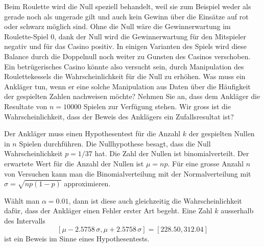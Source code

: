Beim Roulette wird die Null speziell behandelt, weil sie zum Beispiel
weder als gerade noch als ungerade gilt und auch kein Gewinn über
die Einsätze auf rot oder schwarz möglich sind.
Ohne die Null wäre die Gewinnerwartung im Roulette-Spiel 0,
dank der Null wird die Gewinnerwartung für den Mitspieler negativ
und für das Casino positiv. 
In einigen Varianten des Spiels wird diese Balance durch die Doppelnull
noch weiter zu Gunsten des Casinos verschoben.
Ein betrügerisches Casino könnte also versucht sein, durch Manipulation
des Roulettekessels die Wahrscheinlichkeit für die Null zu erhöhen.
Was muss ein Ankläger tun, wenn er eine solche Manipulation
aus Daten über die Häufigkeit der gespielten Zahlen nachweisen möchte?
Nehmen Sie an, dass dem Ankläger die Resultate von $n=10000$ Spielen
zur Verfügung stehen.
Wir gross ist die Wahrscheinlichkeit, dass der Beweis des Anklägers
ein Zufallsresultat ist?

\begin{loesung}
Der Ankläger muss einen Hypothesentest für die Anzahl $k$ der gespielten
Nullen in $n$ Spielen durchführen.
Die Nullhypothese besagt, dass die Null Wahrscheinlichkeit $p=1/37$ hat.
Die Zahl der Nullen ist binomialverteilt.
Der erwartete Wert für die Anzahl der Nullen ist $\mu=np$.
Für eine grosse Anzahl $n$ von Versuchen kann man die Binomialverteilung
mit der Normalverteilung mit $\sigma = \sqrt{np(1-p)}$ 
approximieren.

Wählt man $\alpha=0.01$, dann ist diese auch gleichzeitig die
Wahrscheinlichkeit dafür, dass der Ankläger einen Fehler erster Art
begeht.
Eine Zahl $k$ ausserhalb des Intervalls
\[
[ \mu - 2.5758\,\sigma, \mu + 2.5758\,\sigma]
=
[228.50, 312.04]
\]
ist ein Beweis im Sinne eines Hypothesentests.
\end{loesung}


